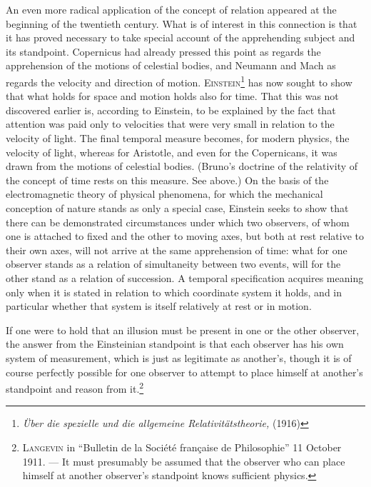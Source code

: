 \documentclass[12pt]{article}
\newcommand{\opage}[1]{\marginnote{\footnotesize\textit{[#1]}}}
\begin{document}
An even more radical application of the concept of relation appeared at
the beginning of the twentieth century. What is of interest in this
connection is that it has proved necessary to take special account of the
apprehending subject and its standpoint. Copernicus had already pressed
this point as regards the apprehension of the motions of celestial bodies,
and Neumann and Mach as regards the velocity and direction of motion.
\textsc{Einstein}\footnote{\textit{Über die spezielle und die allgemeine
  Relativitätstheorie,} (1916)} has now sought to show that what holds
for space and motion holds also for time. That this was not discovered
earlier is, according to Einstein, to be explained by the fact that
attention was paid only to velocities that were very small in relation to
the velocity of light. The final temporal measure becomes, for modern
physics, the velocity of light, whereas for Aristotle, and even for the
Copernicans, it was drawn from the \opage{74}motions of celestial bodies. (Bruno's
doctrine of the relativity of the concept of time rests on this measure.
See above.) On the basis of the electromagnetic theory of physical
phenomena, for which the mechanical conception of nature stands as only a
special case, Einstein seeks to show that there can be demonstrated
circumstances under which two observers, of whom one is attached to fixed
and the other to moving axes, but both at rest relative to their own axes,
will not arrive at the same apprehension of time: what for one observer
stands as a relation of simultaneity between two events, will for the other
stand as a relation of succession. A temporal specification acquires
meaning only when it is stated in relation to which coordinate system it
holds, and in particular whether that system is itself relatively at rest
or in motion.

If one were to hold that an illusion must be present in one or the other
observer, the answer from the Einsteinian standpoint is that each observer
has his own system of measurement, which is just as legitimate as
another's, though it is of course perfectly possible for one observer to
attempt to place himself at another's standpoint and reason from
it.\footnote{\textsc{Langevin} in ``Bulletin de la Société française de
  Philosophie'' 11 October 1911. --- It must presumably be assumed that
  the observer who can place himself at another observer's standpoint knows
  sufficient physics.}
\end{document}
